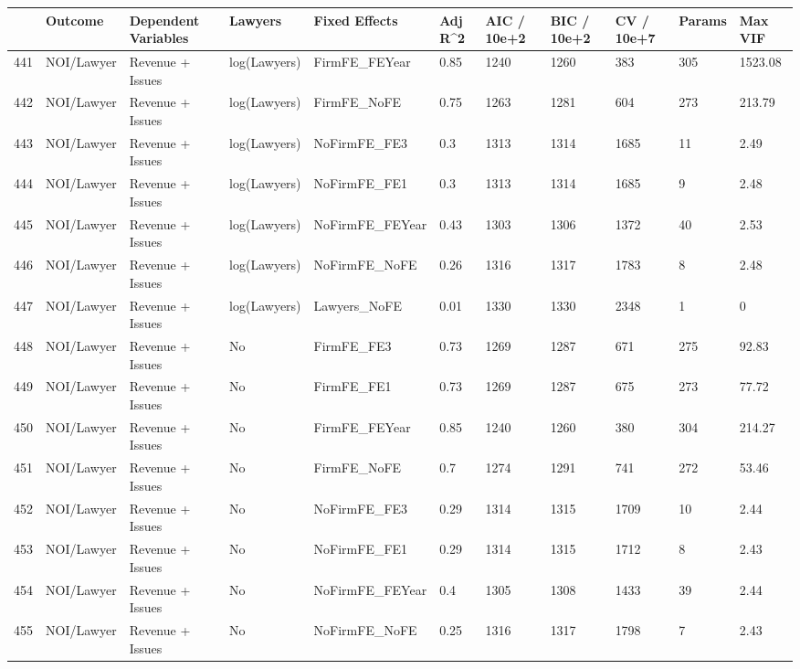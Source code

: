 \begin{table}[ht]
\centering
\begin{tabular}{rllllllllll}
  \hline
 & Outcome & Dependent Variables & Lawyers & Fixed Effects & Adj R^2 & AIC / 10e+2 & BIC / 10e+2 & CV / 10e+7 & Params & Max VIF \\ 
  \hline
441 & NOI/Lawyer & Revenue + Issues & log(Lawyers) & FirmFE\_FEYear & 0.85 & 1240 & 1260 & 383 & 305 & 1523.08 \\ 
  442 & NOI/Lawyer & Revenue + Issues & log(Lawyers) & FirmFE\_NoFE & 0.75 & 1263 & 1281 & 604 & 273 & 213.79 \\ 
  443 & NOI/Lawyer & Revenue + Issues & log(Lawyers) & NoFirmFE\_FE3 & 0.3 & 1313 & 1314 & 1685 & 11 & 2.49 \\ 
  444 & NOI/Lawyer & Revenue + Issues & log(Lawyers) & NoFirmFE\_FE1 & 0.3 & 1313 & 1314 & 1685 & 9 & 2.48 \\ 
  445 & NOI/Lawyer & Revenue + Issues & log(Lawyers) & NoFirmFE\_FEYear & 0.43 & 1303 & 1306 & 1372 & 40 & 2.53 \\ 
  446 & NOI/Lawyer & Revenue + Issues & log(Lawyers) & NoFirmFE\_NoFE & 0.26 & 1316 & 1317 & 1783 & 8 & 2.48 \\ 
  447 & NOI/Lawyer & Revenue + Issues & log(Lawyers) & Lawyers\_NoFE & 0.01 & 1330 & 1330 & 2348 & 1 & 0 \\ 
  448 & NOI/Lawyer & Revenue + Issues & No & FirmFE\_FE3 & 0.73 & 1269 & 1287 & 671 & 275 & 92.83 \\ 
  449 & NOI/Lawyer & Revenue + Issues & No & FirmFE\_FE1 & 0.73 & 1269 & 1287 & 675 & 273 & 77.72 \\ 
  450 & NOI/Lawyer & Revenue + Issues & No & FirmFE\_FEYear & 0.85 & 1240 & 1260 & 380 & 304 & 214.27 \\ 
  451 & NOI/Lawyer & Revenue + Issues & No & FirmFE\_NoFE & 0.7 & 1274 & 1291 & 741 & 272 & 53.46 \\ 
  452 & NOI/Lawyer & Revenue + Issues & No & NoFirmFE\_FE3 & 0.29 & 1314 & 1315 & 1709 & 10 & 2.44 \\ 
  453 & NOI/Lawyer & Revenue + Issues & No & NoFirmFE\_FE1 & 0.29 & 1314 & 1315 & 1712 & 8 & 2.43 \\ 
  454 & NOI/Lawyer & Revenue + Issues & No & NoFirmFE\_FEYear & 0.4 & 1305 & 1308 & 1433 & 39 & 2.44 \\ 
  455 & NOI/Lawyer & Revenue + Issues & No & NoFirmFE\_NoFE & 0.25 & 1316 & 1317 & 1798 & 7 & 2.43 \\ 

\end{tabular}
\end{table}
